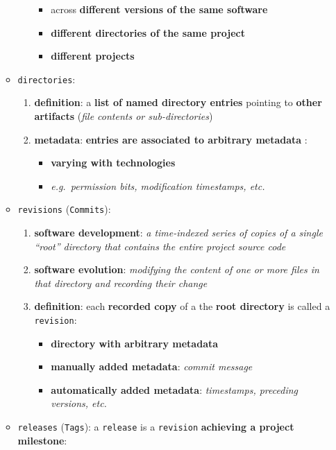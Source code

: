 \documentclass[11pt]{article}
\providecommand{\tightlist}{%
      \setlength{\itemsep}{0pt}\setlength{\parskip}{0pt}}
\begin{document}
\begin{enumerate}
\begin{itemize}
\begin{enumerate}
      \begin{itemize}
      \tightlist
      \item
        across \textbf{different versions of the same software}
      \item
        \textbf{different directories of the same project}
      \item
        \textbf{different projects}
      \end{itemize}
    \end{enumerate}
  \item
    \texttt{directories}:

    \begin{enumerate}
    \def\labelenumii{\arabic{enumii}.}
    \tightlist
    \item
      \textbf{definition}: a \textbf{list of named directory entries}
      pointing to \textbf{other artifacts} (\emph{file contents or
      sub-directories})
    \item
      \textbf{metadata}: \textbf{entries are associated to arbitrary
      metadata} :

      \begin{itemize}
      \tightlist
      \item
        \textbf{varying with technologies}
      \item
        \emph{e.g.~permission bits, modification timestamps, etc.}
      \end{itemize}
    \end{enumerate}
  \item
    \texttt{revisions} (\texttt{Commits}):

    \begin{enumerate}
    \def\labelenumii{\arabic{enumii}.}
    \tightlist
    \item
      \textbf{software development}: \emph{a time-indexed series of
      copies of a single ``root'' directory that contains the entire
      project source code}
    \item
      \textbf{software evolution}: \emph{modifying the content of one or
      more files in that directory and recording their change}
    \item
      \textbf{definition}: each \textbf{recorded copy} of a the
      \textbf{root directory} is called a \texttt{revision}:

      \begin{itemize}
      \tightlist
      \item
        \textbf{directory with arbitrary metadata}
      \item
        \textbf{manually added metadata}: \emph{commit message}
      \item
        \textbf{automatically added metadata}: \emph{timestamps,
        preceding versions, etc.}
      \end{itemize}
    \end{enumerate}
  \item
    \texttt{releases} (\texttt{Tags}): a \texttt{release} is a
    \texttt{revision} \textbf{achieving a project milestone}:


\end{itemize}
\end{enumerate}
\end{document}
